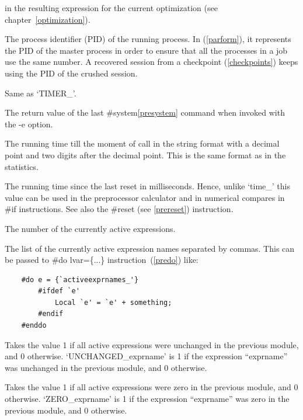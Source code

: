 \begin{description}
               in the resulting expression for the current optimization 
               (see chapter~\ref{optimization}).
\item[PID\_]         The process identifier (PID)   of
               the running process. In \ParFORM{} (\ref{parform}), it represents
               the PID of the master process in order to ensure that all the
               processes in a job use the same number. A recovered session from
               a checkpoint (\ref{checkpoints}) keeps using the PID of the
               crushed session.
\item[STOPWATCH\_] Same as `TIMER\_'.
\item[SYSTEMERROR\_] The return value of the last \#system\ref{presystem}
               command when invoked with the -e option.
\item[TIME\_]  The running time till the moment of call in the string format
               with a decimal point and two digits after the decimal point. 
               This is the same format as in the statistics.
\item[TIMER\_] The running time since the last reset in milliseconds. Hence, 
               unlike `time\_' this value can be used in the preprocessor 
               calculator and in numerical compares in \#if instructions.
               See also the \#reset (see \ref{prereset}) instruction.
\item[NUMACTIVEEXPRS\_]  The number of the currently active expressions.
\item[ACTIVEEXPRNAMES\_]  The list of the currently active expression names 
               separated by commas. This can be passed to \#do lvar=\{...\} 
               instruction~(\ref{predo}) like: 
\begin{verbatim}
    #do e = {`activeexprnames_'}
        #ifdef `e'
            Local `e' = `e' + something;
        #endif
    #enddo
\end{verbatim}
\item[UNCHANGED\_] Takes the value 1 if all active expressions were unchanged in the
                   previous module, and 0 otherwise. `UNCHANGED\_exprname' is 1 if the
                   expression ``exprname'' was unchanged in the previous module, and
                   0 otherwise.
\item[ZERO\_] Takes the value 1 if all active expressions were zero in the
                   previous module, and 0 otherwise. `ZERO\_exprname' is 1 if the
                   expression ``exprname'' was zero in the previous module, and
                   0 otherwise.
\end{description}

